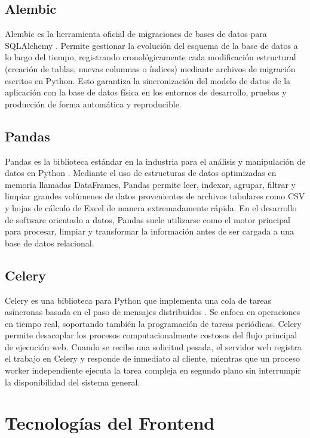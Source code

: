 \subsection{Alembic}
Alembic es la herramienta oficial de migraciones de bases de datos para SQLAlchemy \cite{alembic2024}. Permite gestionar la evolución del esquema de la base de datos a lo largo del tiempo, registrando cronológicamente cada modificación estructural (creación de tablas, nuevas columnas o índices) mediante archivos de migración escritos en Python. Esto garantiza la sincronización del modelo de datos de la aplicación con la base de datos física en los entornos de desarrollo, pruebas y producción de forma automática y reproducible.

\subsection{Pandas}
Pandas es la biblioteca estándar en la industria para el análisis y manipulación de datos en Python \cite{mckinney2010, mckinney2022}. Mediante el uso de estructuras de datos optimizadas en memoria llamadas DataFrames, Pandas permite leer, indexar, agrupar, filtrar y limpiar grandes volúmenes de datos provenientes de archivos tabulares como CSV y hojas de cálculo de Excel de manera extremadamente rápida. En el desarrollo de software orientado a datos, Pandas suele utilizarse como el motor principal para procesar, limpiar y transformar la información antes de ser cargada a una base de datos relacional.

\subsection{Celery}
Celery es una biblioteca para Python que implementa una cola de tareas asíncronas basada en el paso de mensajes distribuidos \cite{solem2024}. Se enfoca en operaciones en tiempo real, soportando también la programación de tareas periódicas. Celery permite desacoplar los procesos computacionalmente costosos del flujo principal de ejecución web. Cuando se recibe una solicitud pesada, el servidor web registra el trabajo en Celery y responde de inmediato al cliente, mientras que un proceso worker independiente ejecuta la tarea compleja en segundo plano sin interrumpir la disponibilidad del sistema general.



\section{Tecnologías del Frontend}

